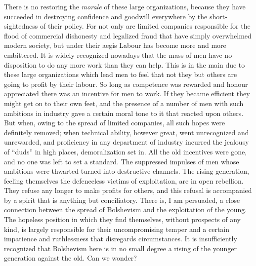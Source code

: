 \documentclass{book}
\begin{document}
There is no restoring the \emph{morale} of these large organizations, because they have succeeded in destroying confidence and goodwill everywhere by the short-sightedness of their policy. For not only are limited companies responsible for the flood of commercial dishonesty and legalized fraud that have simply overwhelmed modern society, but under their aegis Labour has become more and more embittered. It is widely recognized nowadays that the mass of men have no disposition to do any more work than they can help. This is in the main due to these large organizations which lead men to feel that not they but others are going to profit by their labour. So long as competence was rewarded and honour appreciated there was an incentive for men to work. If they became efficient they might get on to their own feet, and the presence of a number of men with such ambitions in industry gave a certain moral tone to it that reacted upon others. But when, owing to the spread of limited companies, all such hopes were definitely removed; when technical ability, however great, went unrecognized and unrewarded, and proficiency in any department of industry incurred the jealousy of “duds” in high places, demoralization set in. All the old incentives were gone, and no one was left to set a standard. The suppressed impulses of men whose ambitions were thwarted turned into destructive channels. The rising generation, feeling themselves the defenceless victims of exploitation, are in open rebellion. They refuse any longer to make profits for others, and this refusal is accompanied by a spirit that is anything but conciliatory. There is, I am persuaded, a close connection between the spread of Bolshevism and the exploitation of the young. The hopeless position in which they find themselves, without prospects of any kind, is largely responsible for their uncompromising temper and a certain impatience and ruthlessness that disregards circumstances. It is insufficiently recognized that Bolshevism here is in no small degree a rising of the younger generation against the old. Can we wonder?
\end{document}
